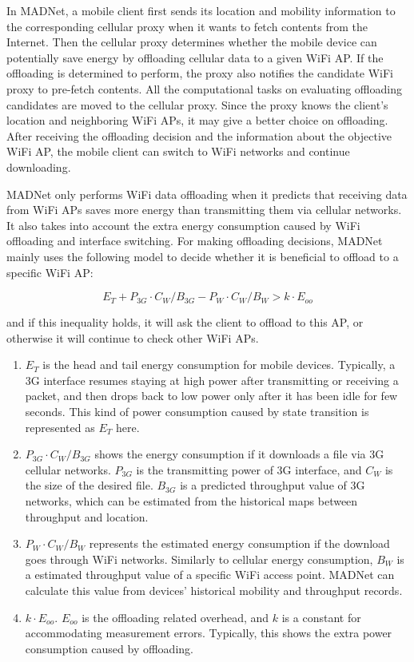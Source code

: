 \documentclass[english]{tktltiki}
\begin{document}
In MADNet, a mobile client first sends its location and mobility information to the corresponding cellular proxy when it wants to fetch contents from the Internet. Then the cellular proxy determines whether the mobile device can potentially save energy by offloading cellular data to a given WiFi AP. If the offloading is determined to perform, the proxy also notifies the candidate WiFi proxy to pre-fetch contents. All the computational tasks on evaluating offloading candidates are moved to the cellular proxy. Since the proxy knows the client's location and neighboring WiFi APs, it may give a better choice on offloading. After receiving the offloading decision and the information about the objective WiFi AP, the mobile client can switch to WiFi networks and continue downloading.

MADNet only performs WiFi data offloading when it predicts that receiving data from WiFi APs saves more energy than transmitting them via cellular networks. It also takes into account the extra energy consumption caused by WiFi offloading and interface switching. For making offloading decisions, MADNet mainly uses the following model to decide whether it is beneficial to offload to a specific WiFi AP:

$$ E_{T} + P_{3G} \cdot C_{W} / B_{3G} - P_{W} \cdot C_{W} / B_{W} > k \cdot E_{oo} $$

and if this inequality holds, it will ask the client to offload to this AP, or otherwise it will continue to check other WiFi APs.

\begin{enumerate}
  \item $ E_T $ is the head and tail energy consumption for mobile devices. Typically, a 3G interface resumes staying at high power after transmitting or receiving a packet, and then drops back to low power only after it has been idle for few seconds. This kind of power consumption caused by state transition is represented as $E_T$ here.  
  \item $ P_{3G} \cdot C_{W} / B_{3G} $ shows the energy consumption if it downloads a file via 3G cellular networks. $P_{3G}$ is the transmitting power of 3G interface, and $C_W$ is the size of the desired file. $B_{3G}$ is a predicted throughput value of 3G networks, which can be estimated from the historical maps between throughput and location.
  \item $ P_{W} \cdot C_{W} / B_{W} $ represents the estimated energy consumption if the download goes through WiFi networks. Similarly to cellular energy consumption, $B_{W}$ is a estimated throughput value of a specific WiFi access point. MADNet can calculate this value from devices' historical mobility and throughput records.
  \item $k \cdot E_{oo}$. $E_{oo}$ is the offloading related overhead, and $k$ is a constant for accommodating measurement errors. Typically, this shows the extra power consumption caused by offloading.
\end{enumerate}
\end{document}
